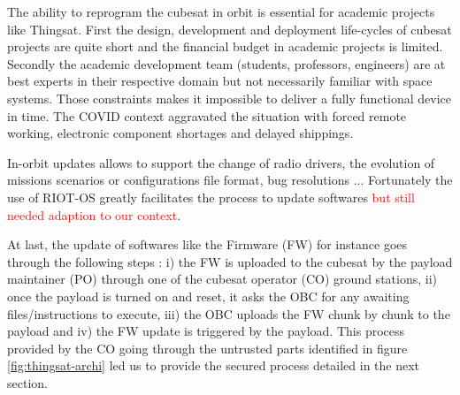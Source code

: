 The ability to reprogram the cubesat in orbit is essential for academic projects
like Thingsat. First the design, development and deployment life-cycles of
cubesat projects are quite short and the financial budget in academic projects
is limited. Secondly the academic development team (students, professors,
engineers) are at best experts in their respective domain but not necessarily
familiar with space systems. Those constraints makes it impossible to
deliver a fully functional device in time. The COVID context aggravated the
situation with forced remote working, electronic component shortages and delayed
shippings. 


In-orbit updates allows to support the change of radio drivers, the evolution of
missions scenarios or configurations file format, bug resolutions ...
Fortunately the use of RIOT-OS greatly facilitates the process to update
softwares \textcolor{red}{but still needed adaption to our context}.

At last, the update of softwares like the Firmware (FW) for instance goes
through the following steps : i) the FW is uploaded to the cubesat by the
payload maintainer (PO) through one of the cubesat operator (CO) ground
stations, ii) once the payload is turned on and reset, it asks the OBC for any
awaiting files/instructions to execute, iii) the OBC uploads the FW chunk by
chunk to the payload and iv) the FW update is triggered by the payload. This
process provided by the CO going through the untrusted parts identified in
figure \ref{fig:thingsat-archi} led us to provide the secured process detailed in the
next section.

